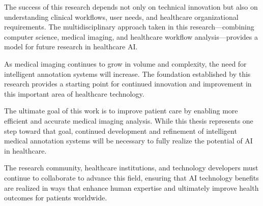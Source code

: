 The success of this research depends not only on technical innovation but also on understanding clinical workflows, user needs, and healthcare organizational requirements. The multidisciplinary approach taken in this research—combining computer science, medical imaging, and healthcare workflow analysis—provides a model for future research in healthcare AI.

As medical imaging continues to grow in volume and complexity, the need for intelligent annotation systems will increase. The foundation established by this research provides a starting point for continued innovation and improvement in this important area of healthcare technology.

The ultimate goal of this work is to improve patient care by enabling more efficient and accurate medical imaging analysis. While this thesis represents one step toward that goal, continued development and refinement of intelligent medical annotation systems will be necessary to fully realize the potential of AI in healthcare.

The research community, healthcare institutions, and technology developers must continue to collaborate to advance this field, ensuring that AI technology benefits are realized in ways that enhance human expertise and ultimately improve health outcomes for patients worldwide. 
